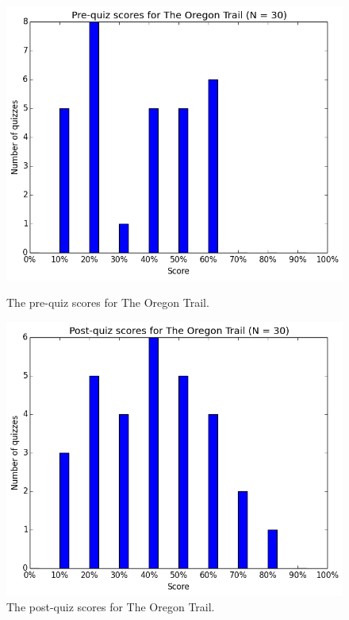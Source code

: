 			\begin{figure}[] 
			\centering 
			\begin{minipage}[b]{0.45\linewidth}
			\includegraphics[width=\textwidth]{oregon_pre.png} 
			\caption{The pre-quiz scores for The Oregon Trail.}
			\end{minipage}
			\quad
			\begin{minipage}[b]{0.45\linewidth}
			\includegraphics[width=\textwidth]{oregon_post.png} 
			\caption{The post-quiz scores for The Oregon Trail.}
			\end{minipage}
			\end{figure}
			

